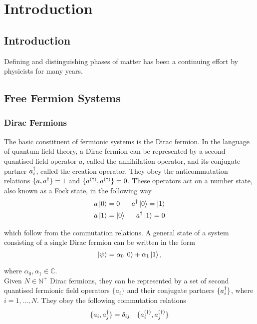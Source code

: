\chapter{Introduction}

\ifpdf
    \graphicspath{{Chapter1/Chapter1Figs/PNG/}{Chapter1/Chapter1/PDF/}{Chapter1/Chapter1Figs/}}
\else
    \graphicspath{{Chapter1/Chapter1Figs/EPS/}{Chapter1/Chapter1/}}
\fi

\section{Introduction}

Defining and distinguishing phases of matter has been a continuing effort by physicists for many years. 

\section{Free Fermion Systems}

\subsection{Dirac Fermions}
The basic constituent of fermionic systems is the Dirac fermion. In the language of quantum field theory, a Dirac fermion can be represented by a second quantised field operator $a$, called the annihilation operator, and its conjugate partner $a^{\dagger}_{i}$, called the creation operator. They obey the anticommutation relations $\{a,a^{\dagger}\}=1$ and $\{a^{(\dagger)},a^{(\dagger)}\}=0$. These operators act on a number state, also known as a Fock state, in the following way
\begin{align}
    &a\ket{0}=0 &a^{\dagger}\ket{0}=\ket{1}\nonumber\\
    &a\ket{1}=\ket{0} &a^{\dagger}\ket{1}=0
\end{align}

\noi which follow from the commutation relations. A general state of a system consisting of a single Dirac fermion can be written in the form 
\begin{equation}
    \ket{\psi}=\alpha_{0}\ket{0}+\alpha_{1}\ket{1},
\end{equation}

\noi where $\alpha_{0},\alpha_{1}\in\mathbb{C}$.\\

Given $N\in\mathbb{N}^{+}$ Dirac fermions, they can be represented by a set of second quantised fermionic field operators $\{a_{i}\}$ and their conjugate partners $\{a_{i}^{\dagger}\}$, where $i=1,...,N$. They obey the following commutation relations
\begin{align}
    &\{a_{i},a_{j}^{\dagger}\}=\delta_{ij} &\{a_{i}^{(\dagger)},a_{j}^{(\dagger)}\}
\end{align}
    
